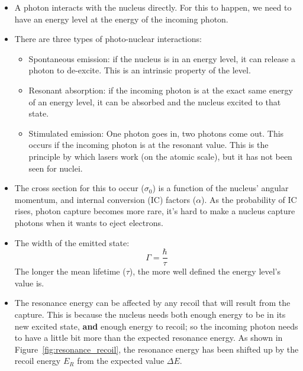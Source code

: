 \documentclass[letter]{article}
\begin{document}
\begin{itemize}
\item A photon interacts with the nucleus directly. For this to
  happen, we need to have an energy level at the energy of the
  incoming photon.~\cite[Lec 25]{lecture}
\item There are three types of photo-nuclear interactions:
  \begin{itemize}
  \item Spontaneous emission: if the nucleus is in an energy level, it
    can release a photon to de-excite. This is an intrinsic property
    of the level.
  \item Resonant absorption: if the incoming photon is at the exact same energy
    of an energy level, it can be absorbed and the nucleus excited to
    that state.
  \item Stimulated emission: One photon goes in, two photons come
    out. This occurs if the incoming photon is at the resonant
    value. This is the principle by which lasers work (on the atomic
    scale), but it has not been seen for nuclei.
  \end{itemize}
  \cite[Lec 25]{lecture}
\item The cross section for this to occur ($\sigma_0$) is a function
  of the nucleus' angular momentum, and internal conversion (IC)
  factors ($\alpha$). As the probability of IC rises, photon capture
  becomes more rare, it's hard to make a nucleus capture photons when
  it wants to eject electrons.~\cite[Lec 25]{lecture}
\item The width of the emitted state:
  \begin{equation*}
    \Gamma = \frac{\hbar}{\tau}
  \end{equation*}
The longer the mean lifetime ($\tau$), the more well defined the
energy level's value is.~\cite[Lec 25]{lecture}
\item The resonance energy can be affected by any recoil that will
  result from the capture. This is because the nucleus needs both
  enough energy to be in its new excited state, \textbf{and} enough energy
  to recoil; so the incoming photon needs to have a little bit more
  than the expected resonance energy. As shown in
  Figure~\ref{fig:resonance_recoil}, the resonance energy has been
  shifted up by the recoil energy $E_R$ from the expected value
  $\Delta{}E$.~\cite[Lec 25]{lecture}


\end{itemize}
\end{document}
